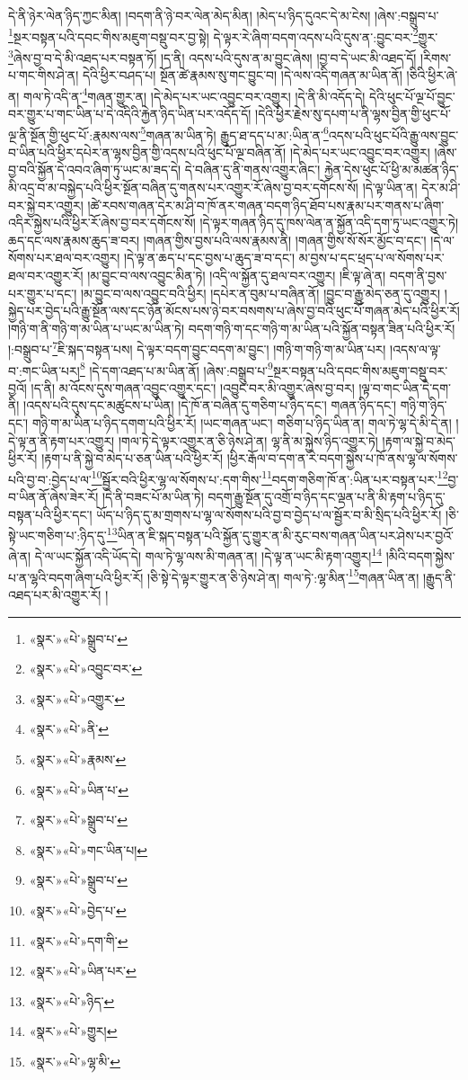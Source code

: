 དེ་ནི་ཉེར་ལེན་ཉིད་ཀྱང་མིན། །བདག་ནི་ཉེ་བར་ལེན་མེད་མིན། །མེད་པ་ཉིད་དུའང་དེ་མ་ངེས། །ཞེས་:བསྒྲུབ་པ་\footnote{«སྣར་»«པེ་»སྒྲུབ་པ་}སྔར་བསྟན་པའི་དབང་གིས་མཇུག་བསྡུ་བར་བྱ་སྟེ། དེ་ལྟར་རེ་ཞིག་བདག་འདས་པའི་དུས་ན་:བྱུང་བར་\footnote{«སྣར་»«པེ་»འབྱུང་བར་}གྱུར་\footnote{«སྣར་»«པེ་»འགྱུར་}ཞེས་བྱ་བ་དེ་མི་འཐད་པར་བསྟན་ཏོ། །ད་ནི། འདས་པའི་དུས་ན་མ་བྱུང་ཞེས། །བྱ་བ་དེ་ཡང་མི་འཐད་དོ། །རིགས་པ་གང་གིས་ཤེ་ན། དེའི་ཕྱིར་བཤད་པ། སྔོན་ཚེ་རྣམས་སུ་གང་བྱུང་བ། །དེ་ལས་འདི་གཞན་མ་ཡིན་ནོ། །ཅིའི་ཕྱིར་ཞེ་ན། གལ་ཏེ་འདི་ན་\footnote{«སྣར་»«པེ་»ནི་}གཞན་གྱུར་ན། །དེ་མེད་པར་ཡང་འབྱུང་བར་འགྱུར། །དེ་ནི་མི་འདོད་དེ། དེའི་ཕུང་པོ་ལྔ་པོ་བྱུང་བར་གྱུར་པ་གང་ཡིན་པ་དེ་འདིའི་རྐྱེན་ཉིད་ཡིན་པར་འདོད་དོ། །དེའི་ཕྱིར་རྗེས་སུ་དཔག་པ་ནི་ལྷས་བྱིན་གྱི་ཕུང་པོ་ལྔ་ནི་སྔོན་གྱི་ཕུང་པོ་:རྣམས་ལས་\footnote{«སྣར་»«པེ་»རྣམས་}གཞན་མ་ཡིན་ཏེ། རྒྱུད་ཐ་དད་པ་མ་:ཡིན་ན་\footnote{«སྣར་»«པེ་»ཡིན་པ་}འདས་པའི་ཕུང་པོའི་རྒྱུ་ལས་བྱུང་བ་ཡིན་པའི་ཕྱིར་དཔེར་ན་ལྷས་བྱིན་གྱི་འདས་པའི་ཕུང་པོ་ལྔ་བཞིན་ནོ། །དེ་མེད་པར་ཡང་འབྱུང་བར་འགྱུར། །ཞེས་བྱ་བའི་སྐྱོན་དེ་འབའ་ཞིག་ཏུ་ཡང་མ་ཟད་དེ། དེ་བཞིན་དུ་ནི་གནས་འགྱུར་ཞིང་། རྐྱེན་དེས་ཕུང་པོ་ཕྱི་མ་མཚན་ཉིད་མི་འདྲ་བ་མ་བསྐྱེད་པའི་ཕྱིར་སྔོན་བཞིན་དུ་གནས་པར་འགྱུར་རོ་ཞེས་བྱ་བར་དགོངས་སོ། །དེ་ལྟ་ཡིན་ན། དེར་མ་ཤི་བར་སྐྱེ་བར་འགྱུར། །ཚེ་རབས་གཞན་དེར་མ་ཤི་བ་ཁོ་ནར་གཞན་བདག་ཉིད་ཐོབ་པས་རྣམ་པར་གནས་པ་ཞིག་འདིར་སྐྱེས་པའི་ཕྱིར་རོ་ཞེས་བྱ་བར་དགོངས་སོ། །དེ་ལྟར་གཞན་ཉིད་དུ་ཁས་ལེན་ན་སྐྱོན་འདི་དག་ཏུ་ཡང་འགྱུར་ཏེ། ཆད་དང་ལས་རྣམས་ཆུད་ཟ་བར། །གཞན་གྱིས་བྱས་པའི་ལས་རྣམས་ནི། །གཞན་གྱིས་སོ་སོར་མྱོང་བ་དང་། །དེ་ལ་སོགས་པར་ཐལ་བར་འགྱུར། །དེ་ལྟ་ན་ཆད་པ་དང་བྱས་པ་ཆུད་ཟ་བ་དང་། མ་བྱས་པ་དང་ཕྲད་པ་ལ་སོགས་པར་ཐལ་བར་འགྱུར་རོ། །མ་བྱུང་བ་ལས་འབྱུང་མིན་ཏེ། །འདི་ལ་སྐྱོན་དུ་ཐལ་བར་འགྱུར། །ཇི་ལྟ་ཞེ་ན། བདག་ནི་བྱས་པར་གྱུར་པ་དང་། །མ་བྱུང་བ་ལས་འབྱུང་བའི་ཕྱིར། །དཔེར་ན་བུམ་པ་བཞིན་ནོ། །བྱུང་བ་རྒྱུ་མེད་ཅན་དུ་འགྱུར། །སྐྱེད་པར་བྱེད་པའི་རྒྱུ་སྔོན་ལས་དང་ཉོན་མོངས་པས་ཉེ་བར་བསགས་པ་ཞེས་བྱ་བའི་ཕུང་པོ་གཞན་མེད་པའི་ཕྱིར་རོ། །གཉི་ག་ནི་གཉི་ག་མ་ཡིན་པ་ཡང་མ་ཡིན་ཏེ། བདག་གཉི་ག་དང་གཉི་ག་མ་ཡིན་པའི་སྐྱོན་བསྟན་ཟིན་པའི་ཕྱིར་རོ། །:བསྒྲུབ་པ་\footnote{«སྣར་»«པེ་»སྒྲུབ་པ་}ཇི་སྐད་བསྟན་པས། དེ་ལྟར་བདག་བྱུང་བདག་མ་བྱུང་། །གཉི་ག་གཉི་ག་མ་ཡིན་པར། །འདས་ལ་ལྟ་བ་:གང་ཡིན་པར།\footnote{«སྣར་»«པེ་»གང་ཡིན་པ།} །དེ་དག་འཐད་པ་མ་ཡིན་ནོ། །ཞེས་:བསྒྲུབ་པ་\footnote{«སྣར་»«པེ་»སྒྲུབ་པ་}སྔར་བསྟན་པའི་དབང་གིས་མཇུག་བསྡུ་བར་བྱའོ། །ད་ནི། མ་འོངས་དུས་གཞན་འབྱུང་འགྱུར་དང་། །འབྱུང་བར་མི་འགྱུར་ཞེས་བྱ་བར། །ལྟ་བ་གང་ཡིན་དེ་དག་ནི། །འདས་པའི་དུས་དང་མཚུངས་པ་ཡིན། །དེ་ཁོ་ན་བཞིན་དུ་གཅིག་པ་ཉིད་དང་། གཞན་ཉིད་དང་། གཉི་ག་ཉིད་དང་། གཉི་ག་མ་ཡིན་པ་ཉིད་དགག་པའི་ཕྱིར་རོ། །ཡང་གཞན་ཡང་། གཅིག་པ་ཉིད་ཡིན་ན། གལ་ཏེ་ལྷ་དེ་མི་དེ་ན། །དེ་ལྟ་ན་ནི་རྟག་པར་འགྱུར། །གལ་ཏེ་དེ་ལྟར་འགྱུར་ན་ཅི་ཉེས་ཤེ་ན། ལྷ་ནི་མ་སྐྱེས་ཉིད་འགྱུར་ཏེ། །རྟག་ལ་སྐྱེ་བ་མེད་ཕྱིར་རོ། །རྟག་པ་ནི་སྐྱེ་བ་མེད་པ་ཅན་ཡིན་པའི་ཕྱིར་རོ། །ཕྱིར་རྒོལ་བ་དག་ན་རེ་བདག་སྐྱེས་པ་ཁོ་ནས་ལྷ་ལ་སོགས་པའི་བྱ་བ་:བྱེད་པ་ལ་\footnote{«སྣར་»«པེ་»བྱེད་པ་}སྦྱོར་བའི་ཕྱིར་ལྷ་ལ་སོགས་པ་:དག་གིས་\footnote{«སྣར་»«པེ་»དག་གི་}བདག་གཅིག་ཁོ་ན་:ཡིན་པར་བསྟན་པར་\footnote{«སྣར་»«པེ་»ཡིན་པར་}བྱ་བ་ཡིན་ནོ་ཞེས་ཟེར་རོ། །དེ་ནི་བཟང་པོ་མ་ཡིན་ཏེ། བདག་རྒྱུ་སྔོན་དུ་འགྲོ་བ་ཉིད་དང་ལྡན་པ་ནི་མི་རྟག་པ་ཉིད་དུ་བསྟན་པའི་ཕྱིར་དང་། ཡོད་པ་ཉིད་དུ་མ་གྲགས་པ་ལྷ་ལ་སོགས་པའི་བྱ་བ་བྱེད་པ་ལ་སྦྱོར་བ་མི་སྲིད་པའི་ཕྱིར་རོ། །ཅི་སྟེ་ཡང་གཅིག་པ་:ཉིད་དུ་\footnote{«སྣར་»«པེ་»ཉིད་}ཡིན་ན་ཇི་སྐད་བསྟན་པའི་སྐྱོན་དུ་གྱུར་ན་མི་རུང་བས་གཞན་ཡིན་པར་ཤེས་པར་བྱའོ་ཞེ་ན། དེ་ལ་ཡང་སྐྱོན་འདི་ཡོད་དེ། གལ་ཏེ་ལྷ་ལས་མི་གཞན་ན། །དེ་ལྟ་ན་ཡང་མི་རྟག་འགྱུར།\footnote{«སྣར་»«པེ་»གྱུར།} །མིའི་བདག་སྐྱེས་པ་ན་ལྷའི་བདག་ཞིག་པའི་ཕྱིར་རོ། །ཅི་སྟེ་དེ་ལྟར་གྱུར་ན་ཅི་ཉེས་ཤེ་ན། གལ་ཏེ་:ལྷ་མིན་\footnote{«སྣར་»«པེ་»ལྷ་མི་}གཞན་ཡིན་ན། །རྒྱུད་ནི་འཐད་པར་མི་འགྱུར་རོ། །

